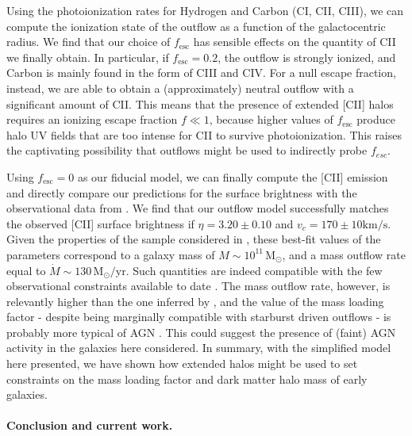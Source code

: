 \documentclass[12pt]{article}
\begin{document}
Using the photoionization rates for Hydrogen and Carbon (CI, CII, CIII), we can compute the ionization state of the outflow as a function of the galactocentric radius. We find that our choice of $f_\mathrm{esc}$ has sensible effects on the quantity of CII we finally obtain. In particular, if $f_\mathrm{esc}=0.2$, the outflow is strongly ionized, and Carbon is mainly found in the form of CIII and CIV. For a null escape fraction, instead, we are able to obtain a (approximately) neutral outflow with a significant amount of CII. This means that the presence of extended [CII] halos requires an ionizing escape fraction $f\ll 1$, because higher values of $f_\mathrm{esc}$ produce halo UV fields that are too intense for CII to survive photoionization. This raises the captivating possibility that outflows might be used to indirectly probe $f_{esc}$. 

Using $f_\mathrm{esc}=0$ as our fiducial model, we can finally compute the [CII] emission and directly compare our predictions for the surface brightness with the observational data from \citet{Fujimoto19}.  We find that our outflow model successfully matches the observed [CII] surface brightness if $\eta = 3.20 \pm 0.10$ and $v_c = 170 \pm 10 \mathrm{km/s}$. Given the properties of the sample considered in \citet{Fujimoto19}, these best-fit values of the parameters correspond to a galaxy mass of $M\sim 10^{11}\,\mathrm{M}_\odot$, and a mass outflow rate equal to $\dot{M}\sim 130 \,\mathrm{M}_\odot/\mathrm{yr}$. Such quantities are indeed compatible with the few observational constraints available to date \citep{gallerani:2018, herrera2021kiloparsec}. The mass outflow rate, however, is relevantly higher than the one inferred by \citet{gallerani:2018}, and the value of the mass loading factor - despite being marginally compatible with starburst driven outflows \citep[e.g.,][]{Heckman15} - is probably more typical of AGN \citep{Fiore_2017}. This could suggest the presence of (faint) AGN activity in the galaxies here considered. In summary, with the simplified model here presented, we have shown how extended halos might be used to set constraints on the mass loading factor and dark matter halo mass of early galaxies. 




\paragraph{Conclusion and current work.}
\end{document}

